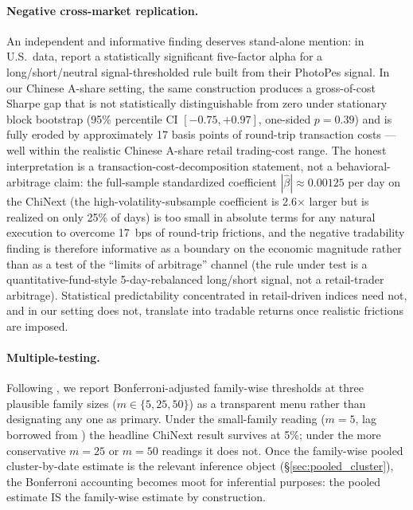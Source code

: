 \documentclass[AER]{AEA}
\begin{document}
\paragraph{Negative cross-market replication.} An independent and informative finding deserves stand-alone mention: in U.S.\ data, \citet{obaid2022picture} report a statistically significant five-factor alpha for a long/short/neutral signal-thresholded rule built from their PhotoPes signal. In our Chinese A-share setting, the same construction produces a gross-of-cost Sharpe gap that is not statistically distinguishable from zero under stationary block bootstrap (95\% percentile CI $[-0.75, +0.97]$, one-sided $p=0.39$) and is fully eroded by approximately 17 basis points of round-trip transaction costs --- well within the realistic Chinese A-share retail trading-cost range. The honest interpretation is a transaction-cost-decomposition statement, not a behavioral-arbitrage claim: the full-sample standardized coefficient $|\hat\beta| \approx 0.00125$ per day on the ChiNext (the high-volatility-subsample coefficient is 2.6$\times$ larger but is realized on only 25\% of days) is too small in absolute terms for any natural execution to overcome 17~bps of round-trip frictions, and the negative tradability finding is therefore informative as a boundary on the economic magnitude rather than as a test of the \citet{shleifer1997limits} ``limits of arbitrage'' channel (the rule under test is a quantitative-fund-style 5-day-rebalanced long/short signal, not a retail-trader arbitrage). Statistical predictability concentrated in retail-driven indices need not, and in our setting does not, translate into tradable returns once realistic frictions are imposed.

\paragraph{Multiple-testing.} Following \citet{harvey2016cross}, we report Bonferroni-adjusted family-wise thresholds at three plausible family sizes ($m \in \{5, 25, 50\}$) as a transparent menu rather than designating any one as primary. Under the small-family reading ($m=5$, lag borrowed from \citet{obaid2022picture}) the headline ChiNext result survives at 5\%; under the more conservative $m=25$ or $m=50$ readings it does not. Once the family-wise pooled cluster-by-date estimate is the relevant inference object (\S\ref{sec:pooled_cluster}), the Bonferroni accounting becomes moot for inferential purposes: the pooled estimate IS the family-wise estimate by construction.
\end{document}
